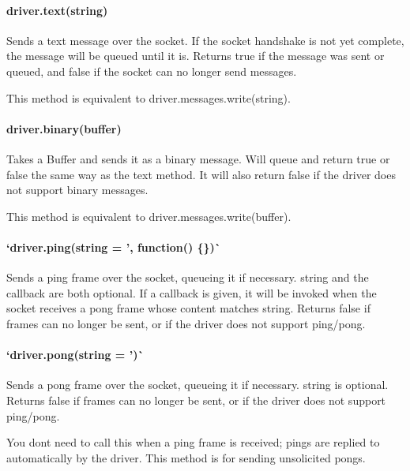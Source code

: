 \paragraph*{{\ttfamily driver.\+text(string)}}

Sends a text message over the socket. If the socket handshake is not yet complete, the message will be queued until it is. Returns {\ttfamily true} if the message was sent or queued, and {\ttfamily false} if the socket can no longer send messages.

This method is equivalent to {\ttfamily driver.\+messages.\+write(string)}.

\paragraph*{{\ttfamily driver.\+binary(buffer)}}

Takes a {\ttfamily Buffer} and sends it as a binary message. Will queue and return {\ttfamily true} or {\ttfamily false} the same way as the {\ttfamily text} method. It will also return {\ttfamily false} if the driver does not support binary messages.

This method is equivalent to {\ttfamily driver.\+messages.\+write(buffer)}.

\paragraph*{`driver.\+ping(string = '\textquotesingle{}, function() \{\})\`{}}

Sends a ping frame over the socket, queueing it if necessary. {\ttfamily string} and the callback are both optional. If a callback is given, it will be invoked when the socket receives a pong frame whose content matches {\ttfamily string}. Returns {\ttfamily false} if frames can no longer be sent, or if the driver does not support ping/pong.

\paragraph*{`driver.\+pong(string = '\textquotesingle{})\`{}}

Sends a pong frame over the socket, queueing it if necessary. {\ttfamily string} is optional. Returns {\ttfamily false} if frames can no longer be sent, or if the driver does not support ping/pong.

You don\textquotesingle{}t need to call this when a ping frame is received; pings are replied to automatically by the driver. This method is for sending unsolicited pongs.

